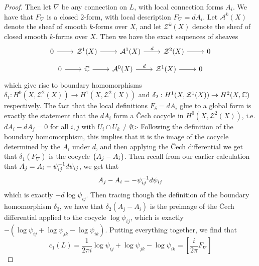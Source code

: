 \begin{proof}
Then let $\nabla$ be any connection on $L$, with local connection forms $A_i$.
We have that $F_\nabla$ is a closed $2$-form, with local description $F_\nabla = dA_i$.
Let $\mathcal{A}^k(X)$ denote the sheaf of smooth $k$-forms over $X$, and
let $\mathcal{Z}^k(X)$ denote the sheaf of closed smooth $k$-forms over $X$.
Then we have the exact sequences of sheaves
\[\begin{tikzcd}
0 \ar[r] & \mathcal{Z}^1(X) \ar[r] & \mathcal{A}^1(X) \ar[r, "d"] & \mathcal{Z}^2(X)
\ar[r] & 0
\end{tikzcd}\]
\[\begin{tikzcd}
0 \ar[r] & \C \ar[r] & \mathcal{A}^0(X) \ar[r, "d"] & \mathcal{Z}^1(X) \ar[r] & 0
\end{tikzcd}\]
which give rise to boundary homomorphisms
$\delta_1 : H^0(X, \mathcal{Z}^2(X)) \to H^1(X, \mathcal{Z}^2(X))$ and
$\delta_2 : H^1(X, \mathcal{Z}^1(X)) \to H^2(X, \mathbb{C})$ respectively. The
fact that the local definitions $F_\delta = dA_i$ glue to a global form
is exactly the statement that the $dA_i$ form a \v{C}ech cocycle in
$H^0(X, \mathcal{Z}^2(X))$, i.e. $dA_i - dA_j = 0$ for all $i,j$ with
$U_i \cap U_k \neq \emptyset$> Following the definition of the boundary homomorphism,
this implies that it is the image of the cocycle determined by the $A_i$ under
$d$, and then applying the \v{C}ech differential we get that
$\delta_1(F_\nabla)$ is the cocycle $\left\lbrace A_j - A_i \right\rbrace$. Then recall from our earlier
calculation that $A_j = A_i - \psi_{ij}^{-1} d\psi_{ij}$, we get that
\[
A_j - A_i = -\psi_{ij}^{-1} d\psi_{ij}
\]
which is exactly $-d\log\psi_{ij}$. Then tracing though the definition of the
boundary homomorphism $\delta_2$, we have that $\delta_2(A_j - A_i)$
is the preimage of the \v{C}ech differential applied to the cocycle
$\log\psi_{ij}$, which is exactly $-(\log\psi_{ij} + \log\psi_{jk} - \log\psi_{ik})$.
Putting everything together, we find that
\[
c_1(L) = \frac{1}{2\pi i}\log\psi_{ij} + \log\psi_{jk} - \log\psi_{ik}
= \left[ \frac{i}{2\pi}F_\nabla \right]
\]
\end{proof}
%
